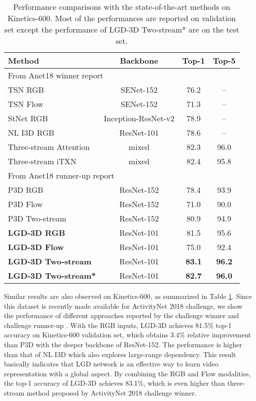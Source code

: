 \documentclass[10pt,twocolumn,letterpaper]{article}
\begin{document}
\begin{table}
\centering
\small
\caption{\small Performance comparisons with the state-of-the-art methods on Kinetics-600. Most of the performances are reported on validation set except the performance of LGD-3D Two-stream* are on the test set.}
\vspace{0.1cm}
\begin{tabular}{@{~~}l@{~}c@{~}|c|c@{~~}} \hline
\begin{minipage}{1.5cm}\vspace{0.12cm} \textbf{Method} \vspace{0.12cm}\end{minipage} & \textbf{Backbone} & \textbf{Top-1} & \textbf{Top-5} \\ \hline
\multicolumn{2}{l|}{From Anet18 winner report \cite{he2018exploiting}} &&\\
TSN RGB & SENet-152 & 76.2 & -- \\
TSN Flow & SENet-152 & 71.3 & -- \\
StNet RGB & Inception-ResNet-v2  & 78.9 & -- \\
NL I3D RGB & ResNet-101 & 78.6 & -- \\
Three-stream Attention & mixed & 82.3 & 96.0 \\
Three-stream iTXN & mixed & 82.4 & 95.8 \\ \hline
\multicolumn{2}{l|}{From Anet18 runner-up report \cite{yao2018yh}} &&\\
P3D RGB & ResNet-152 & 78.4 & 93.9 \\
P3D Flow & ResNet-152 & 71.0 & 90.0 \\
P3D Two-stream & ResNet-152 & 80.9 & 94.9 \\ \hline
\textbf{LGD-3D RGB} & ResNet-101 & 81.5 & 95.6 \\
\textbf{LGD-3D Flow} & ResNet-101 & 75.0 & 92.4 \\
\textbf{LGD-3D Two-stream} & ResNet-101 & \textbf{83.1} & \textbf{96.2} \\ \hline
\textbf{LGD-3D Two-stream*} & ResNet-101 & \textbf{82.7} & \textbf{96.0} \\ \hline
\end{tabular}
\vspace{-0.15in}
\label{tab:k600}
\end{table}

Similar results are also observed on Kinetics-600, as summarized in Table \ref{tab:k600}. Since this dataset is recently made available for ActivityNet 2018 challenge, we show the performance of different approaches reported by the challenge winner \cite{he2018exploiting} and challenge runner-up \cite{yao2018yh}. With the RGB inputs, LGD-3D achieves 81.5\% top-1 accuracy on Kinetics-600 validation set, which obtains 3.4\% relative improvement than P3D with the deeper backbone of ResNet-152. The performance is higher than that of NL I3D which also explores large-range dependency. This result basically indicates that LGD network is an effective way to learn video representation with a global aspect. By combining the RGB and Flow modalities, the top-1 accuracy of LGD-3D achieves 83.1\%, which is even higher than three-stream method proposed by ActivityNet 2018 challenge winner.
\end{document}
